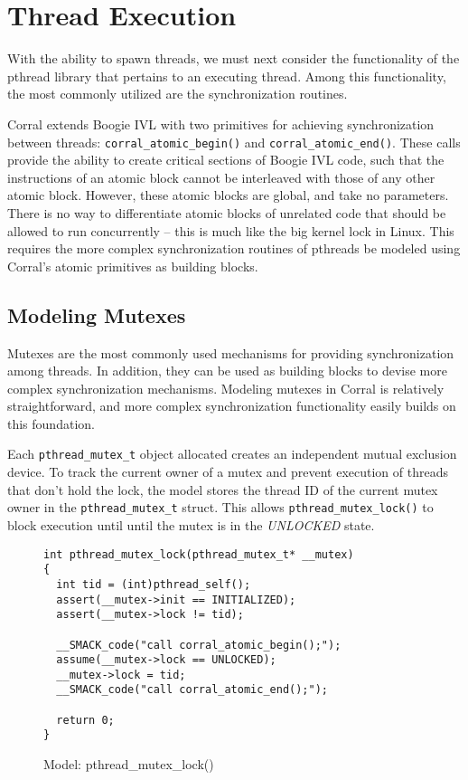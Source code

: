 \section{Thread Execution}
With the ability to spawn threads, we must next consider the
functionality of the pthread library that pertains to an executing
thread.  Among this functionality, the most commonly utilized are the
synchronization routines. 

Corral extends Boogie IVL with two primitives for achieving
synchronization between threads: \lstinline|corral_atomic_begin()| and
\lstinline|corral_atomic_end()|.  These calls provide the ability to
create critical sections of Boogie IVL code, such that the
instructions of an atomic block cannot be interleaved with those of
any other atomic block.  However, these atomic blocks are global, and
take no parameters.  There is no way to differentiate atomic blocks of
unrelated code that should be allowed to run concurrently -- this is
much like the big kernel lock in Linux.  This requires the more
complex synchronization routines of pthreads be modeled using
Corral's atomic primitives as building blocks.  

\subsection{Modeling Mutexes}
Mutexes are the most commonly used mechanisms for providing
synchronization among threads.  In addition, they can be used as
building blocks to devise more complex synchronization mechanisms.
Modeling mutexes in Corral is relatively straightforward, and more
complex synchronization functionality easily builds on this
foundation. 

Each \lstinline|pthread_mutex_t| object allocated creates an
independent mutual exclusion device.  To track the current owner of a
mutex and prevent execution of threads that don't hold the lock, the
model stores the thread ID of the current mutex owner in the
\lstinline|pthread_mutex_t| struct.  This allows
\lstinline|pthread_mutex_lock()| to block execution until until the
mutex is in the \emph{UNLOCKED} state.


\begin{figure}[!ht]
\centering
\begin{lstlisting}
int pthread_mutex_lock(pthread_mutex_t* __mutex)
{
  int tid = (int)pthread_self();
  assert(__mutex->init == INITIALIZED);
  assert(__mutex->lock != tid);

  __SMACK_code("call corral_atomic_begin();");
  assume(__mutex->lock == UNLOCKED);
  __mutex->lock = tid;
  __SMACK_code("call corral_atomic_end();");

  return 0;
}
\end{lstlisting}
\caption{Model: pthread\_mutex\_lock()}\label{fig:pthread_mutex_lock}
\end{figure}

